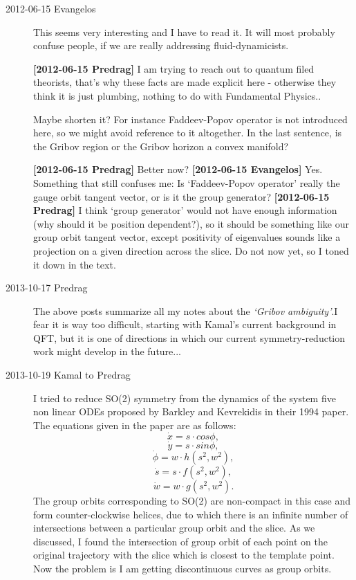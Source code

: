\begin{description}
\item[2012-06-15 Evangelos]
This seems very interesting and I have to read it. It will most probably
confuse people, if we are really addressing fluid-dynamicists.

{\bf [2012-06-15 Predrag]} I am trying to reach out to quantum filed
theorists, that's why these facts are made explicit here - otherwise they
think it is just plumbing, nothing to do with Fundamental Physics..

Maybe shorten it? For instance Faddeev-Popov operator is not introduced
here, so we might avoid reference to it altogether. In the last sentence,
is the Gribov region or the Gribov horizon a convex manifold?

{\bf [2012-06-15 Predrag]} Better now? {\bf [2012-06-15 Evangelos]}  Yes.
Something that still confuses me: Is `Faddeev-Popov operator' really the
gauge orbit tangent vector, or is it the group generator? {\bf
[2012-06-15 Predrag]} I think `group generator' would not have enough
information (why should it be position dependent?), so it should be
something like our group orbit tangent vector, except positivity of
eigenvalues sounds like a projection on a given direction across the
slice. Do not now yet, so I toned it down in the text.

\item[2013-10-17 Predrag] The above posts summarize all my
notes about the \emph{`Gribov ambiguity'}.I fear it is way too difficult,
starting with Kamal's current background in QFT, but it is one of
directions in which our current symmetry-reduction work might
develop in the future...

\item[2013-10-19 Kamal to Predrag] I tried to reduce SO(2) symmetry from the dynamics of 
the system five non linear ODEs proposed by Barkley and Kevrekidis in their 1994 paper. The equations
given in the paper are as follows:
\[ \dot{x}= s \cdot cos{\phi} ,\] 
\[ \dot{y}= s \cdot sin{\phi} ,\]
\[ \dot{\phi}= w \cdot h(s^2,w^2) ,\]
\[ \dot{s}= s \cdot f(s^2,w^2) ,\]
\[ \dot{w}= w \cdot g(s^2,w^2).\]
The group orbits corresponding to SO(2) are non-compact in this case and form counter-clockwise helices, due to 
which there is an infinite number of intersections between a particular group orbit and the slice. As we discussed, I found the intersection of
group orbit of each point on the original trajectory with the slice which is closest to the template point. Now the problem is I am getting
discontinuous curves as group orbits.


\end{description}

